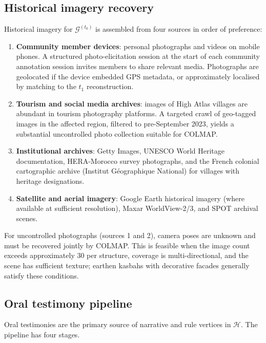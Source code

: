 \documentclass[11pt,a4paper]{article}
\theoremstyle{plain}
\theoremstyle{definition}
\theoremstyle{remark}
\newcommand{\GS}{\mathcal{G}}
\newcommand{\HG}{\mathcal{H}}
\begin{document}
\subsection{Historical imagery recovery}
\label{sec:fieldwork_historical}

Historical imagery for $\GS^{(t_0)}$ is assembled from four sources
in order of preference:
\begin{enumerate}[leftmargin=2em]
  \item \textbf{Community member devices}: personal photographs and
    videos on mobile phones. A structured photo-elicitation session
    at the start of each community annotation session invites members
    to share relevant media. Photographs are geolocated if the device
    embedded GPS metadata, or approximately localised by matching to
    the $t_1$ reconstruction.
  \item \textbf{Tourism and social media archives}: images of High
    Atlas villages are abundant in tourism photography platforms.
    A targeted crawl of geo-tagged images in the affected region,
    filtered to pre-September 2023, yields a substantial uncontrolled
    photo collection suitable for COLMAP.
  \item \textbf{Institutional archives}: Getty Images, UNESCO World
    Heritage documentation, HERA-Morocco survey photographs, and the
    French colonial cartographic archive (Institut G\'{e}ographique
    National) for villages with heritage designations.
  \item \textbf{Satellite and aerial imagery}: Google Earth historical
    imagery (where available at sufficient resolution), Maxar
    WorldView-2/3, and SPOT archival scenes.
\end{enumerate}

For uncontrolled photographs (sources 1 and 2), camera poses are
unknown and must be recovered jointly by COLMAP. This is feasible when
the image count exceeds approximately 30 per structure, coverage is
multi-directional, and the scene has sufficient texture; earthen kasbahs
with decorative facades generally satisfy these conditions.

\subsection{Oral testimony pipeline}
\label{sec:fieldwork_oral}

Oral testimonies are the primary source of narrative and rule vertices
in $\HG$. The pipeline has four stages.
\end{document}
